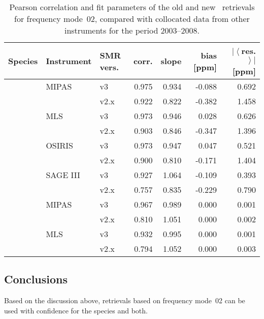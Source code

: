 \begin{table}[hbt]
\centering
\caption{Pearson correlation and fit parameters of the old and new \smr\
retrievals for frequency mode~02, compared with collocated data from other
instruments for the period 2003--2008.
}
\label{tab:fm02:stats}
\begin{tabular}{lllrrrr}
    \toprule
    \textbf{Species} & \textbf{Instrument} & \textbf{SMR vers.} & \textbf{corr.} & \textbf{slope} & \textbf{bias [ppm]} & \textbf{$\left|\left<\right.\right.$res.$\left.\left.\right>\right|$ [ppm]} \\
    \midrule
    \chem{O3}   & MIPAS     & v3    & 0.975 & 0.934 & -0.088    & 0.692 \\
                &           & v2.x  & 0.922 & 0.822 & -0.382    & 1.458 \\
    \cline{2-7}
                & MLS       & v3    & 0.973 & 0.946 & 0.028     & 0.626 \\
                &           & v2.x  & 0.903 & 0.846 & -0.347    & 1.396 \\
    \cline{2-7}
                & OSIRIS    & v3    & 0.973 & 0.947 & 0.047     & 0.521 \\
                &           & v2.x  & 0.900 & 0.810 & -0.171    & 1.404 \\
    \cline{2-7}
                & SAGE III  & v3    & 0.927 & 1.064 & -0.109    & 0.393 \\
                &           & v2.x  & 0.757 & 0.835 & -0.229    & 0.790 \\
    \midrule
    \chem{HNO_3}    & MIPAS     & v3    & 0.967 & 0.989 & 0.000     & 0.001 \\
                    &           & v2.x  & 0.810 & 1.051 & 0.000     & 0.002 \\
    \cline{2-7}
                    & MLS       & v3    & 0.932 & 0.995 & 0.000     & 0.001 \\
                    &           & v2.x  & 0.794 & 1.052 & 0.000     & 0.003 \\
    \bottomrule
\end{tabular}
\end{table}

\subsection{Conclusions}
\label{sec:fm02:conclusions}
Based on the discussion above, retrievals based on frequency mode~02 can be
used with confidence for the species \chem{O_3} and \chem{HNO_3} both.
